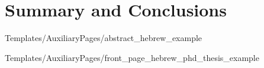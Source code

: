 \documentclass[a4paper,12pt,oneside]{book}
\begin{document}
\chapter{Summary and Conclusions}
\label{sec_conclusions}





\backmatter
\pagestyle{empty}

            {Templates/AuxiliaryPages/abstract_hebrew_example}
\clearpage


            {Templates/AuxiliaryPages/front_page_hebrew_phd_thesis_example}
\clearpage
\end{document}
